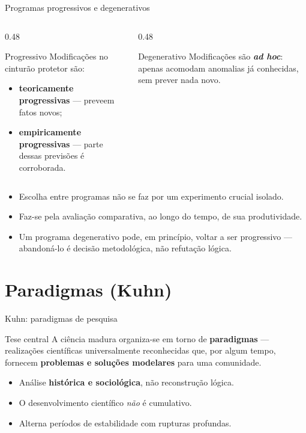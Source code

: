 \documentclass[aspectratio=169]{beamer}
\newcommand{\impt}[1]{\textcolor{maccent}{\textbf{#1}}}
\newcommand{\ntc}[1]{\textcolor{mprimary}{#1}}
\begin{document}
\begin{frame}{Programas progressivos e degenerativos}
\begin{columns}[T]
\begin{column}{0.48\textwidth}
\begin{block}{Progressivo}
Modifica\c c\~oes no cintur\~ao protetor s\~ao:
\begin{itemize}
    \item \impt{teoricamente progressivas} --- preveem fatos novos;
    \item \impt{empiricamente progressivas} --- parte dessas previs\~oes \'e corroborada.
\end{itemize}
\end{block}
\end{column}
\begin{column}{0.48\textwidth}
\begin{alertblock}{Degenerativo}
Modifica\c c\~oes s\~ao \impt{\textit{ad hoc}}: apenas acomodam anomalias j\'a conhecidas, sem prever nada novo.
\end{alertblock}
\end{column}
\end{columns}
\vspace{0.4cm}
\begin{itemize}
    \item Escolha entre programas n\~ao se faz por um experimento crucial isolado.
    \item Faz-se pela \ntc{avalia\c c\~ao comparativa, ao longo do tempo}, de sua produtividade.
    \item Um programa degenerativo pode, em princ\'ipio, voltar a ser progressivo --- abandon\'a-lo \'e decis\~ao metodol\'ogica, n\~ao refuta\c c\~ao l\'ogica.
\end{itemize}
\end{frame}

\section{Paradigmas (Kuhn)}

\begin{frame}{Kuhn: paradigmas de pesquisa}
\begin{block}{Tese central}
A ci\^encia madura organiza-se em torno de \impt{paradigmas} --- realiza\c c\~oes cient\'ificas universalmente reconhecidas que, por algum tempo, fornecem \impt{problemas e solu\c c\~oes modelares} para uma comunidade.
\end{block}
\vspace{0.3cm}
\begin{itemize}
    \item An\'alise \impt{hist\'orica e sociol\'ogica}, n\~ao reconstru\c c\~ao l\'ogica.
    \item O desenvolvimento cient\'ifico \emph{n\~ao} \'e cumulativo.
    \item Alterna \ntc{per\'iodos de estabilidade} com \ntc{rupturas profundas}.
\end{itemize}
\end{frame}
\end{document}
